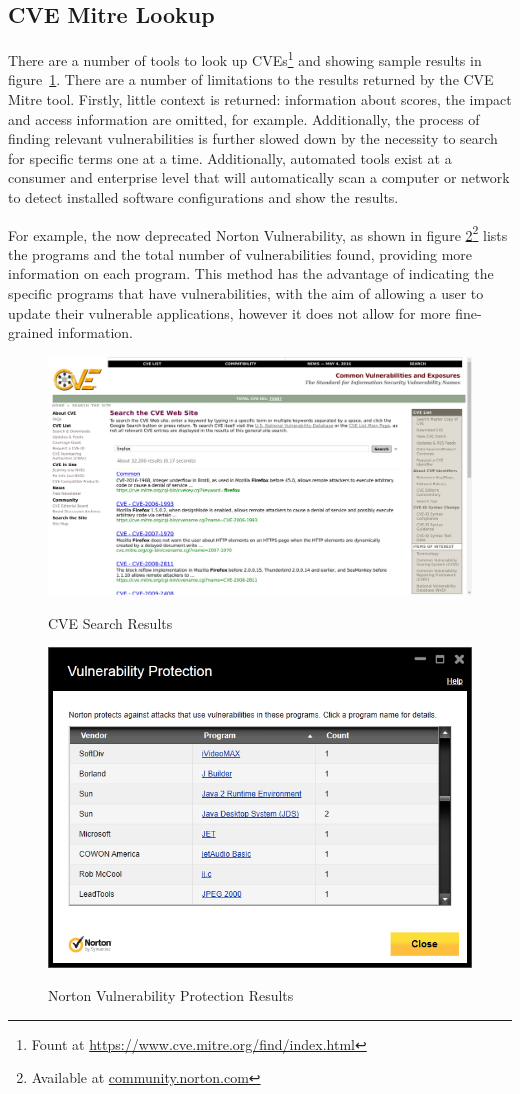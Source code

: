 \subsection{CVE Mitre Lookup}
There are a number of tools to look up CVEs\footnote{Fount at \url{https://www.cve.mitre.org/find/index.html}} and showing sample results in figure~\ref{fig:cve}.  There are a number of limitations to the results returned by the CVE Mitre tool.  Firstly, little context is returned: information about scores, the impact and access information are omitted, for example.  Additionally, the process of finding relevant vulnerabilities is further slowed down by the necessity to search for specific terms one at a time.  Additionally, automated tools exist at a consumer and enterprise level that will automatically scan a computer or network to detect installed software configurations and show the results.  

For example, the now deprecated Norton Vulnerability, as shown in figure \ref{fig:nort}\footnote{Available at \url{community.norton.com}} lists the programs and the total number of  vulnerabilities found, providing more information on each program.  This method has the advantage of indicating the specific programs that have vulnerabilities, with the aim of allowing a user to update their vulnerable applications, however it does not allow for more fine-grained information.
\begin{figure}
\centering 
\includegraphics[width=0.8\linewidth]{cve-lookup} 
\label{fig:cve}
\caption{CVE Search Results}
\end{figure}
\begin{figure}
\centering 
\includegraphics[width=0.8\linewidth]{norton-cve} 
\label{fig:nort}
\caption{Norton Vulnerability Protection Results}
\end{figure}
